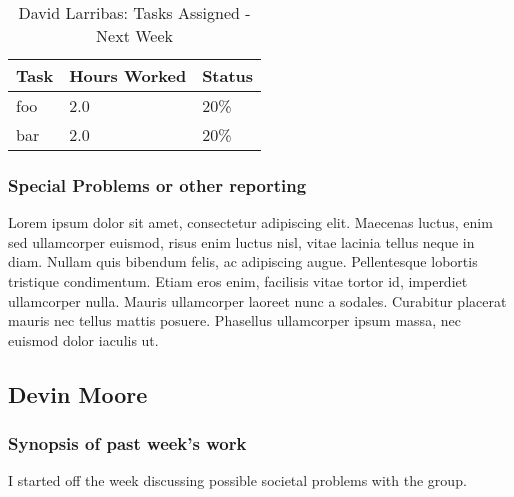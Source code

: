 \documentclass[12pt,article,compsoc]{IEEEtran}
\begin{document}
	\begin{table}[ht]
	\renewcommand{\arraystretch}{1.3}
		\caption{David Larribas: Tasks Assigned - Next Week}
		
		\label{Summary of David Larribas' activites: this week}
		
		\centering
		\begin{tabular}{p{5.5cm}|p{1cm}|p{1cm}}
		\hline

		\bfseries 	Task		 		& \bfseries Hours Worked	& \bfseries Status	\\
		\hline\hline
					foo					& 2.0						& 20\%				\\	%
					bar					& 2.0						& 20\%				\\	
		\hline
		\end{tabular}
	\end{table}

	\subsubsection*{Special Problems or other reporting}
	Lorem ipsum dolor sit amet, consectetur adipiscing elit. Maecenas luctus, enim sed ullamcorper euismod, risus enim luctus nisl, vitae lacinia tellus neque in diam. Nullam quis bibendum felis, ac adipiscing augue. Pellentesque lobortis tristique condimentum. Etiam eros enim, facilisis vitae tortor id, imperdiet ullamcorper nulla. Mauris ullamcorper laoreet nunc a sodales. Curabitur placerat mauris nec tellus mattis posuere. Phasellus ullamcorper ipsum massa, nec euismod dolor iaculis ut.

\subsection{Devin Moore}

	\subsubsection*{Synopsis of past week's work}

	I started off the week discussing possible societal problems with the group. 
\end{document}
